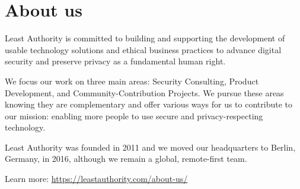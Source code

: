 \chapter*{About us}

Least Authority is committed to building and supporting the development of usable technology solutions and ethical business practices to advance digital security and preserve privacy as a fundamental human right.

We focus our work on three main areas: Security Consulting, Product Development, and Community-Contribution Projects. We pursue these areas knowing they are complementary and offer various ways for us to contribute to our mission: enabling more people to use secure and privacy-respecting technology. 

Least Authority was founded in 2011 and we moved our headquarters to Berlin, Germany, in 2016, although we remain a global, remote-first team.

Learn more: \href{https://leastauthority.com/about-us/}{https://leastauthority.com/about-us/}
